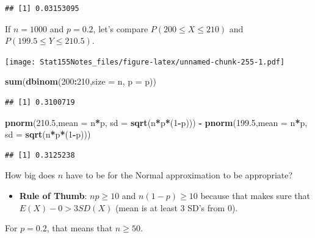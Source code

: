 \documentclass[]{book}
\newenvironment{Shaded}{\begin{snugshade}}{\end{snugshade}}
\newcommand{\DataTypeTok}[1]{\textcolor[rgb]{0.13,0.29,0.53}{#1}}
\newcommand{\DecValTok}[1]{\textcolor[rgb]{0.00,0.00,0.81}{#1}}
\newcommand{\FloatTok}[1]{\textcolor[rgb]{0.00,0.00,0.81}{#1}}
\newcommand{\KeywordTok}[1]{\textcolor[rgb]{0.13,0.29,0.53}{\textbf{#1}}}
\newcommand{\NormalTok}[1]{#1}
\newcommand{\OperatorTok}[1]{\textcolor[rgb]{0.81,0.36,0.00}{\textbf{#1}}}
\newcommand{\StringTok}[1]{\textcolor[rgb]{0.31,0.60,0.02}{#1}}
\providecommand{\tightlist}{%
  \setlength{\itemsep}{0pt}\setlength{\parskip}{0pt}}
\begin{document}
\begin{verbatim}
## [1] 0.03153095
\end{verbatim}

If \(n=1000\) and \(p=0.2\), let's compare \(P(200\leq X\leq 210)\) and \(P(199.5\leq Y\leq 210.5)\).

\texttt{[image: Stat155Notes\_files/figure-latex/unnamed-chunk-255-1.pdf]}

\begin{Shaded}
\begin{Highlighting}[]
\KeywordTok{sum}\NormalTok{(}\KeywordTok{dbinom}\NormalTok{(}\DecValTok{200}\OperatorTok{:}\DecValTok{210}\NormalTok{,}\DataTypeTok{size =}\NormalTok{ n, }\DataTypeTok{p =}\NormalTok{ p))}
\end{Highlighting}
\end{Shaded}

\begin{verbatim}
## [1] 0.3100719
\end{verbatim}

\begin{Shaded}
\begin{Highlighting}[]
\KeywordTok{pnorm}\NormalTok{(}\FloatTok{210.5}\NormalTok{,}\DataTypeTok{mean =}\NormalTok{ n}\OperatorTok{*}\NormalTok{p, }\DataTypeTok{sd =} \KeywordTok{sqrt}\NormalTok{(n}\OperatorTok{*}\NormalTok{p}\OperatorTok{*}\NormalTok{(}\DecValTok{1}\OperatorTok{-}\NormalTok{p))) }\OperatorTok{-}\StringTok{ }\KeywordTok{pnorm}\NormalTok{(}\FloatTok{199.5}\NormalTok{,}\DataTypeTok{mean =}\NormalTok{ n}\OperatorTok{*}\NormalTok{p, }\DataTypeTok{sd =} \KeywordTok{sqrt}\NormalTok{(n}\OperatorTok{*}\NormalTok{p}\OperatorTok{*}\NormalTok{(}\DecValTok{1}\OperatorTok{-}\NormalTok{p)))}
\end{Highlighting}
\end{Shaded}

\begin{verbatim}
## [1] 0.3125238
\end{verbatim}

How big does \(n\) have to be for the Normal approximation to be appropriate?

\begin{itemize}
\tightlist
\item
  \textbf{Rule of Thumb}: \(np \geq 10\) and \(n(1-p)\geq 10\) because that makes sure that \(E(X)-0>3SD(X)\) (mean is at least 3 SD's from 0).
\end{itemize}

For \(p=0.2\), that means that \(n\geq 50\).
\end{document}
